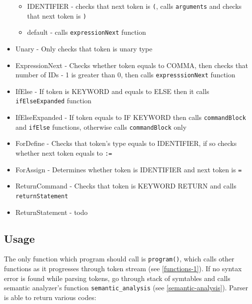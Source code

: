 \documentclass[11pt, titlepage]{article}
\begin{document}
\begin{itemize}[itemsep=-5pt]
  \begin{itemize}[itemsep=-5pt]
  \item
    IDENTIFIER - checks that next token is \texttt{(}, calls
    \texttt{arguments} and checks that next token is \texttt{)}
  \item
    default - calls \texttt{expressionNext} function
  \end{itemize}
\item
  Unary - Only checks that token is unary type
\item
  ExpressionNext - Checks whether token equals to COMMA, then checks
  that number of IDs - 1 is greater than 0, then calls
  \texttt{expresssionNext} function
\item
  IfElse - If token is KEYWORD and equals to ELSE then it calls
  \texttt{ifElseExpanded} function
\item
  IfElseExpanded - If token equals to IF KEYWORD then calls
  \texttt{commandBlock} and \texttt{ifElse} functions, otherwise calls
  \texttt{commandBlock} only
\item
  ForDefine - Checks that token's type equals to IDENTIFIER, if so
  checks whether next token equals to \texttt{:=}
\item
  ForAssign - Determines whether token is IDENTIFIER and next token is
  \texttt{=}
\item
  ReturnCommand - Checks that token is KEYWORD RETURN and calls
  \texttt{returnStatement}
\item
  ReturnStatement - todo
\end{itemize}

\subsection{Usage}\label{usage-1}

The only function which program should call is \texttt{program()}, which
calls other functions as it progresses through
token stream (see \ref{functions-1}). If no syntax error is
found while parsing tokens, go through stack of
symtables and calls semantic analyzer's function \texttt{semantic\_analysis} (see \ref{semantic-analysis}). Parser is
able to return various codes:
\end{document}
